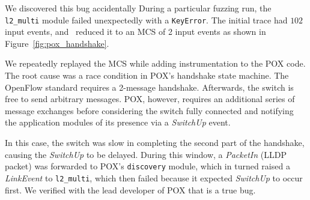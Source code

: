  We discovered this bug accidentally
During a particular fuzzing run, the
\verb=l2_multi= module failed unexpectedly with a \verb=KeyError=. The initial trace
had $102$ input events, and \projectname~reduced it to an MCS of 2 input events as shown in
Figure~\ref{fig:pox_handshake}.

We repeatedly replayed the MCS while adding
instrumentation to the POX code. The root cause was a race
condition in POX's handshake state machine. The OpenFlow standard
requires a 2-message handshake. Afterwards, the switch is free to send
arbitrary messages. POX, however, requires an additional series of message
exchanges before considering the switch fully connected and notifying the
application modules of its presence via a \emph{SwitchUp} event.

In this case, the switch was slow in completing the second part
of the handshake, causing the \emph{SwitchUp} to be delayed. During this window,
a \emph{PacketIn} (LLDP packet) was forwarded to POX's
\verb=discovery= module, which in turned raised a \emph{LinkEvent} to
\verb=l2_multi=, which then failed because it expected \emph{SwitchUp} to occur first.
We verified with the lead developer of POX that is a true bug.

